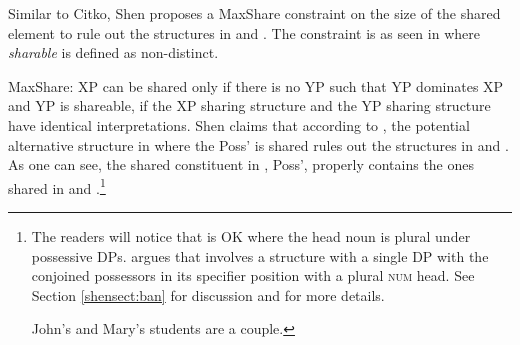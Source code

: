 \documentclass[output=paper]{langscibook}
\begin{document}
Similar to Citko, Shen proposes a MaxShare constraint on the size of the shared element to rule out the structures in  and . The constraint is as seen in  where \textit{sharable} is defined as non-distinct.
 
\ea 
	\label{shenform1}
	MaxShare: XP can be shared only if there is no YP such that YP dominates XP and YP is shareable, if the XP sharing structure and the YP sharing structure have identical interpretations. 
\z
Shen claims that according to 
, the potential alternative structure in  where the Poss' is shared rules out the structures in  and . 
As one can see, the shared constituent in , Poss', properly contains the ones shared in  and .\footnote{The readers will notice that  is OK where the head noun is plural under possessive DPs. 
\cite{Shen:2018a} argues that  involves a structure with a single DP with the conjoined possessors in its specifier position with a plural \textsc{num} head. 
See Section \ref{shensect:ban} for discussion and \citealt{Shen:2018a} for more details.

\ea 
	\label{shenftn5exi}
	John's and Mary's students are a couple.
\z
}
\end{document}
